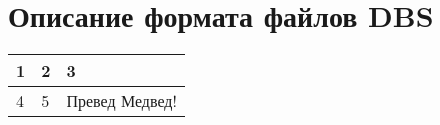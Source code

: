 
\chapter{
  Описание формата файлов DBS
}
\label{app:dbs}

\newcommand{\dbsRecord}[1]{
  \noindent
  \begin{tabularx}{\textwidth}{|p{3em}|p{4em}|X|}
    \hline
    1 & 2 & 3 \\
    \hline
    #1
    \\
    \hline
  \end{tabularx}
}

\dbsRecord{
  4 & 5 & Превед Медвед!
}
